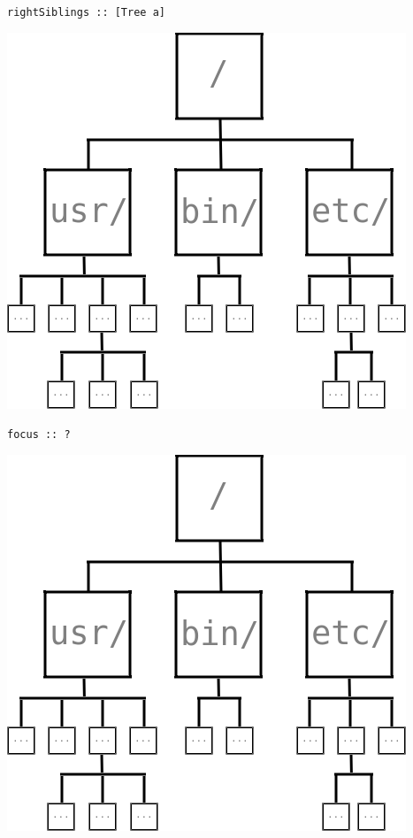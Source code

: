 \begin{frame}[fragile]
\begin{block}{\lstinline{rightSiblings :: [Tree a]}}
\begin{center}
\includegraphics[width=0.60\textheight]{image/rosetree.png}
\end{center}
\end{block}
\end{frame}

\begin{frame}[fragile]
\begin{block}{\lstinline{focus :: ?}}
\begin{center}
\includegraphics[width=0.60\textheight]{image/rosetree.png}
\end{center}
\end{block}
\end{frame}

